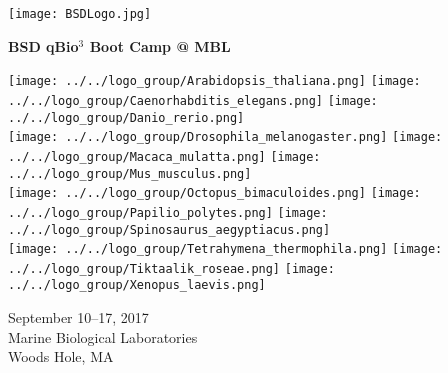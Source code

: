 \documentclass{article}
\begin{document}
\begin{centering}
\texttt{[image: BSDLogo.jpg]}

\vspace{0.11in}

\Huge{\textbf{BSD qBio$^3$ Boot Camp @ MBL}}

\vspace{0.4in}

\texttt{[image: ../../logo\_group/Arabidopsis\_thaliana.png]}
\texttt{[image: ../../logo\_group/Caenorhabditis\_elegans.png]}
\texttt{[image: ../../logo\_group/Danio\_rerio.png]}\\
\texttt{[image: ../../logo\_group/Drosophila\_melanogaster.png]}
\texttt{[image: ../../logo\_group/Macaca\_mulatta.png]}
\texttt{[image: ../../logo\_group/Mus\_musculus.png]}\\
\texttt{[image: ../../logo\_group/Octopus\_bimaculoides.png]}
\texttt{[image: ../../logo\_group/Papilio\_polytes.png]}
\texttt{[image: ../../logo\_group/Spinosaurus\_aegyptiacus.png]}\\
\texttt{[image: ../../logo\_group/Tetrahymena\_thermophila.png]}
\texttt{[image: ../../logo\_group/Tiktaalik\_roseae.png]}
\texttt{[image: ../../logo\_group/Xenopus\_laevis.png]}

\vspace{0.4in}

\Large{September 10--17, 2017}\\
\Large{Marine Biological Laboratories}\\
\Large{Woods Hole, MA}

\end{centering}
\end{document}
